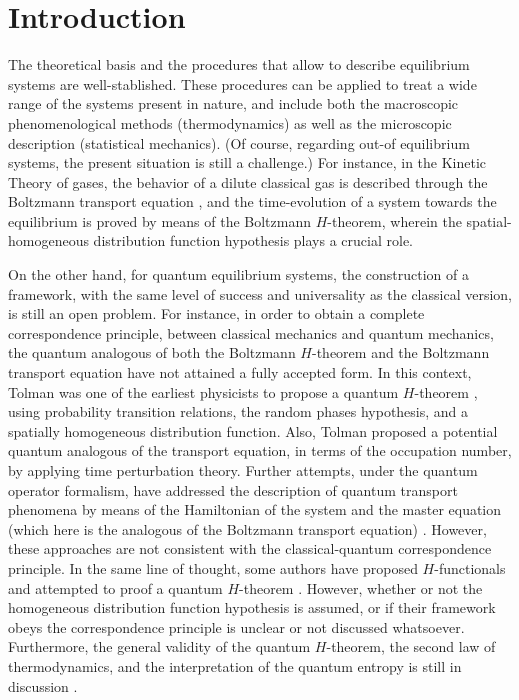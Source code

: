 \section{Introduction}

The theoretical basis and the procedures that allow to describe equilibrium systems
are well-stablished. These procedures can be applied to treat a wide range of the systems
present in nature, and include both the macroscopic phenomenological methods (thermodynamics)
as well as the microscopic description (statistical mechanics).
(Of course, regarding out-of equilibrium systems, the present situation is still a challenge.) 
For instance,
in the Kinetic Theory of gases, the behavior of a dilute classical gas
is described through the Boltzmann transport equation \cite{bib:huang},
and the time-evolution of a system towards the equilibrium is proved by
means of the Boltzmann $H$-theorem, wherein the
spatial-homogeneous distribution function hypothesis plays a crucial role.

On the other hand, for quantum equilibrium systems, the construction of a framework,
with the same level of
success and universality as the classical version, is still an open problem. For instance,
in order to obtain a complete correspondence principle, between classical mechanics
and quantum mechanics, the quantum analogous of both the Boltzmann $H$-theorem
and the Boltzmann transport equation have not attained a fully accepted form.
In this context, Tolman was one of the earliest physicists to propose a quantum
$H$-theorem \cite{bib:tolman}, using probability transition relations, the random
phases hypothesis, and a spatially homogeneous distribution function.
Also, Tolman proposed a potential quantum analogous of the transport equation,
in terms of the occupation number,
by applying time perturbation theory. Further attempts, under the quantum operator
formalism, have addressed the description of quantum transport phenomena by means of the Hamiltonian
of the system and the master equation (which here is the analogous
of the Boltzmann transport equation)
\cite{bib:grabert1974,bib:wang2014,%
bib:angel2017,
bib:amato2020,bib:nicacio2015,bib:hussein2014}. However, these approaches 
are not consistent with the classical-quantum correspondence principle.
In the same line of thought, some authors have proposed $H$-functionals
and attempted to proof a
quantum $H$-theorem \cite{bib:gorban2014,bib:bennaim2017,bib:silva2010,%
bib:deroeck2006,bib:acharya2019,bib:kastner2017,bib:han2015,bib:das2018,bib:vonneumann2010}.
However, whether or not the homogeneous distribution function hypothesis is assumed, or
if their framework obeys the correspondence principle is unclear or not discussed whatsoever.
Furthermore, the general validity
of the quantum $H$-theorem, the second law of thermodynamics, and the
interpretation of the quantum entropy is still in discussion %
\cite{bib:silva2010,bib:acharya2019,bib:kastner2017,bib:han2015,bib:brown2008,%
bib:dragoljub2009,bib:vonneumann2010,%
bib:syros1999,bib:lesovik2016,
bib:lesovik2019}.

